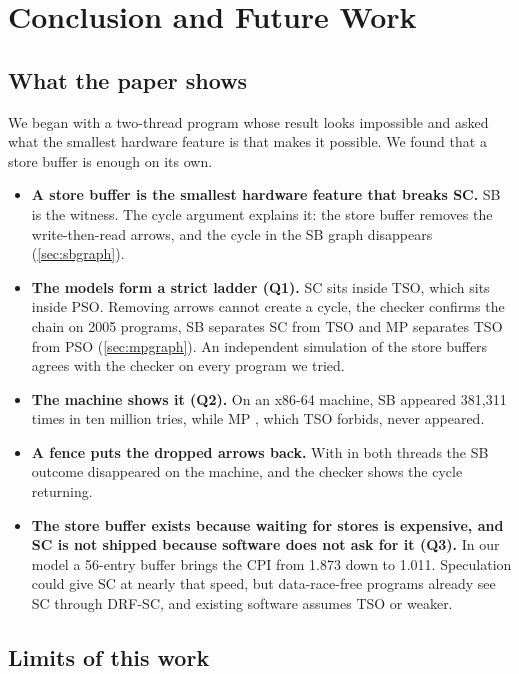 \chapter{Conclusion and Future Work}
\label{ch:conclusion}

\section{What the paper shows}

We began with a two-thread program whose result looks impossible and asked what the smallest hardware feature is that makes it possible. We found that a store buffer is enough on its own.

\begin{itemize}
\item \textbf{A store buffer is the smallest hardware feature that breaks SC.} SB  is the witness. The cycle argument explains it: the store buffer removes the write-then-read arrows, and the cycle in the SB graph disappears (\cref{sec:sbgraph}).
\item \textbf{The models form a strict ladder (Q1).} SC sits inside TSO, which sits inside PSO. Removing arrows cannot create a cycle, the checker confirms the chain on 2005 programs, SB separates SC from TSO and MP separates TSO from PSO (\cref{sec:mpgraph}). An independent simulation of the store buffers agrees with the checker on every program we tried.
\item \textbf{The machine shows it (Q2).} On an x86-64 machine, SB  appeared 381{,}311 times in ten million tries, while MP , which TSO forbids, never appeared.
\item \textbf{A fence puts the dropped arrows back.} With  in both threads the SB outcome disappeared on the machine, and the checker shows the cycle returning.
\item \textbf{The store buffer exists because waiting for stores is expensive, and SC is not shipped because software does not ask for it (Q3).} In our model a 56-entry buffer brings the CPI from 1.873 down to 1.011. Speculation could give SC at nearly that speed, but data-race-free programs already see SC through DRF-SC, and existing software assumes TSO or weaker.
\end{itemize}

\section{Limits of this work}

